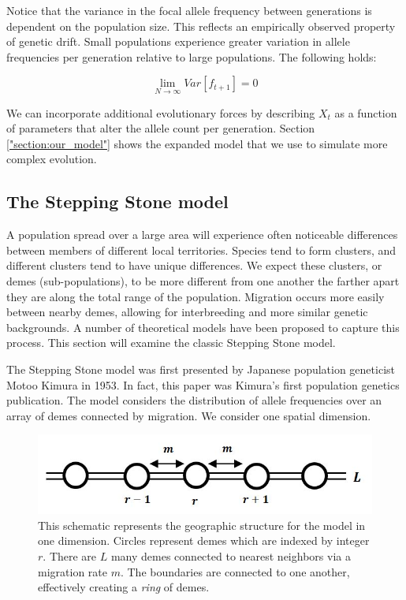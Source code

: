 Notice that the variance in the focal allele frequency between generations is dependent on the population size. This reflects an empirically observed property of genetic drift. Small populations experience greater variation in allele frequencies per generation relative to large populations. The following holds:

\begin{equation}\label{eq:var_lim_drift}
    \lim_{N \to \infty} Var[f_{t+1}] = 0
\end{equation}

We can incorporate additional evolutionary forces by describing $X_t$ as a function of parameters that alter the allele count per generation. Section \ref{"section:our_model"} shows the expanded model that we use to simulate more complex evolution. 


\subsection{The Stepping Stone model}

A population spread over a large area will experience often noticeable differences between members of different local territories. Species tend to form clusters, and different clusters tend to have unique differences. We expect these clusters, or demes (sub-populations), to be more different from one another the farther apart they are along the total range of the population. Migration occurs more easily between nearby demes, allowing for interbreeding and more similar genetic  backgrounds. A number of theoretical models have been proposed to capture this process.\cite{wright_differential_1945} \cite{malecot_heterozygosity_1975} This section will examine the classic Stepping Stone model. 

The Stepping Stone model was first presented by Japanese population geneticist Motoo Kimura in 1953. \cite{kimura_stepping_1953} In fact, this paper was Kimura's first population genetics publication. \cite{crow_motoo_1997} The model considers the distribution of allele frequencies over an array of demes connected by migration. We consider one spatial dimension. 

\begin{figure}[H]
    \centering
    \includegraphics[scale=0.8]{img/model_schematic.JPG}
    \caption{This schematic represents the geographic structure for the model in one dimension. Circles represent demes which are indexed by integer $r$. There are $L$ many demes connected to nearest neighbors via a migration rate $m$. The boundaries are connected to one another, effectively creating a \textit{ring} of demes.}
    \label{fig:schematic}
\end{figure}


